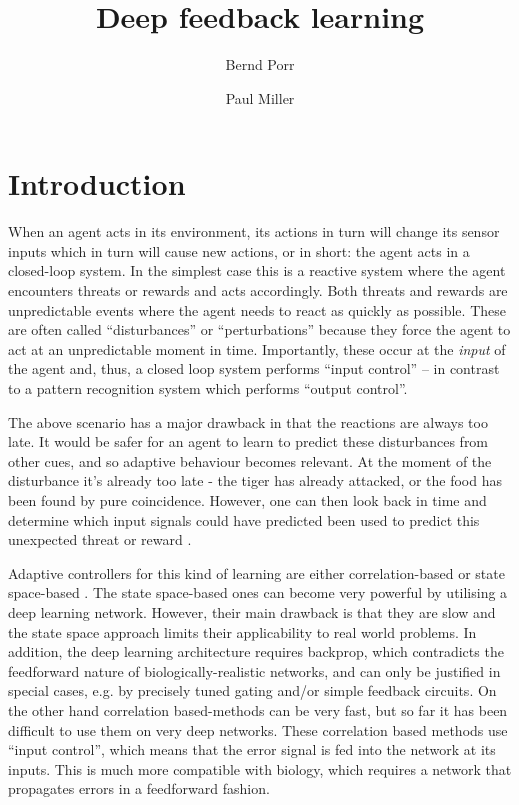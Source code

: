 \documentclass{llncs}
\title{Deep feedback learning}
\author{Bernd Porr \and Paul Miller}
\institute{Glasgow Neuro, bernd,paul@glasgowneuro.tech}
\begin{document}
\maketitle

\begin{abstract}

\end{abstract}

\section{Introduction}
When an agent acts in its environment, its actions in turn will
change its sensor inputs which in turn will cause new actions, or in
short: the agent acts in a closed-loop system. In the simplest case this
is a reactive system where the agent encounters threats or rewards and
acts accordingly. Both threats and rewards are unpredictable events
where the agent needs to react as quickly as possible. These are often 
called ``disturbances'' or ``perturbations'' because they force
the agent to act at an unpredictable moment in time. Importantly, these
occur at the \textsl{input} of the agent and, thus, a closed loop system
performs ``input control'' -- in contrast to a pattern recognition system
which performs ``output control''.

The above scenario has a major drawback in that the reactions are always
too late.  It would be safer for an agent to learn to predict these
disturbances from other cues, and so adaptive behaviour becomes
relevant. At the moment of the disturbance it's already too late - the
tiger has already attacked, or the food has been found by pure
coincidence. However, one can then look back in time and determine
which input signals could have predicted been used to predict this unexpected
threat or reward \cite{Sutton98,Woergoetter2005,PorrNecoInvco2003}.

Adaptive controllers for this kind of learning are either
correlation-based \cite{PorrNecoISO2003,Verschure91} or state
space-based \cite{Dayan1992,Sutton98}. The state space-based ones can become very powerful by utilising
a deep learning network. However, their main drawback is that they are
slow and the state space approach limits their applicability to real
world problems. In addition, the deep learning architecture requires
backprop, which contradicts the feedforward nature of
biologically-realistic networks, and can only be justified in special
cases, e.g. by precisely tuned gating and/or simple feedback circuits. On the other hand correlation based-methods can be very
fast, but so far it has been difficult to use them on very deep networks.  These correlation based methods use ``input
control'', which means that the error signal is fed into the network
at its inputs. This is much more compatible with biology, which
requires a network that propagates errors in a feedforward fashion.
\end{document}
